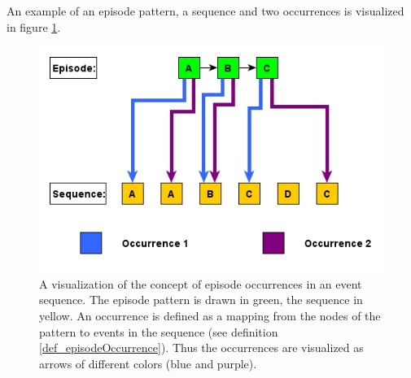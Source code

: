 An example of an episode pattern, a sequence and two occurrences is visualized in figure \ref{fig_occurrenceExample}.

\begin{figure}[h]
	\centering
  	\includegraphics[width=\textwidth]{occurrenceExample}
	\caption{A visualization of the concept of episode occurrences in an event sequence. The episode pattern is drawn in green, the sequence in yellow. An occurrence is defined as a mapping from the nodes of the pattern to events in the sequence (see definition \ref{def_episodeOccurrence}). Thus the occurrences are visualized as arrows of different colors (blue and purple). }
	\label{fig_occurrenceExample}
\end{figure}


